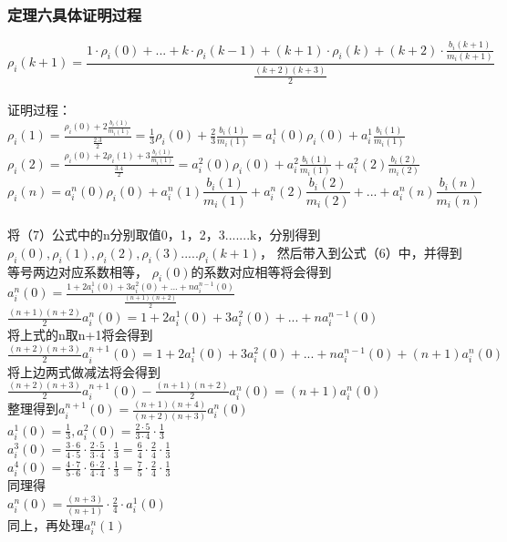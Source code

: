 \documentclass[10pt,journal,letterpaper,compsoc]{IEEEtran}
\begin{document}
\begin{CJK}{UTF8}{gkai}
\subsubsection*{定理六具体证明过程}
\begin{equation}  
\rho_i(k+1)=\frac{1\cdot\rho_i(0)+...+k\cdot\rho_i(k-1)+(k+1)\cdot\rho_i(k)+(k+2)\cdot\frac{b_i(k+1)}{m_i(k+1)}}{\frac{(k+2)(k+3)}{2}}
\end{equation}
\\证明过程：
\\$\rho_i(1)=\frac{\rho_i(0)+2\frac{b_i(1)}{m_i(1)}}{\frac{2.3}{2}}=\frac{1}{3}\rho_i(0)+\frac{2}{3}\frac{b_i(1)}{m_i(1)}=a_i^1(0)\rho_i(0)+a_i^1\frac{b_i(1)}{m_i(1)}$
\\$\rho_i(2)=\frac{\rho_i(0)+2\rho_i(1)+3\frac{b_i(1)}{m_i(1)}}{\frac{3.4}{2}}=a_i^2(0)\rho_i(0)+a_i^2\frac{b_i(1)}{m_i(1)}+a_i^2(2)\frac{b_i(2)}{m_i(2)}$
\begin{equation}
\rho_i(n)=a_i^n(0)\rho_i(0)+a_i^n(1)\frac{b_i(1)}{m_i(1)}+a_i^n(2)\frac{b_i(2)}{m_i(2)}+...+a_i^n(n)\frac{b_i(n)}{m_i(n)}
\end{equation}
\\将（7）公式中的n分别取值0，1，2，3.......k，分别得到
$\rho_i(0),\rho_i(1),\rho_i(2),\rho_i(3).....\rho_i(k+1)$，
然后带入到公式（6）中，并得到等号两边对应系数相等，
$\rho_i(0)$的系数对应相等将会得到
$a_i^n(0)=\frac{1+2a_i^1(0)+3a_i^2(0)+...+na_i^{n-1}(0)}{\frac{(n+1)(n+2)}{2}}$
\\${\frac{(n+1)(n+2)}{2}}a_i^n(0)={1+2a_i^1(0)+3a_i^2(0)+...+na_i^{n-1}(0)}$
\\将上式的n取n+1将会得到
\\${\frac{(n+2)(n+3)}{2}}a_i^{n+1}(0)={1+2a_i^1(0)+3a_i^2(0)+...+na_i^{n-1}(0)+(n+1)a_i^n(0)}$ 
\\将上边两式做减法将会得到
\\${\frac{(n+2)(n+3)}{2}}a_i^{n+1}(0)-{\frac{(n+1)(n+2)}{2}}a_i^n(0)=(n+1)a_i^n(0)$
\\整理得到$a_i^{n+1}(0)=\frac{(n+1)(n+4)}{(n+2)(n+3)}a_i^n(0)$
\\$a_i^1(0)=\frac{1}{3},a_i^2(0)=\frac{2 \cdot 5}{3 \cdot 4} \cdot \frac{1}{3}$
\\$a_i^3(0)=\frac{3 \cdot 6}{4 \cdot 5 } \cdot \frac{2 \cdot 5}{3 \cdot 4} \cdot \frac{1}{3}
=\frac{6}{4} \cdot \frac{2}{4} \cdot \frac{1}{3}$
\\$a_i^4(0)=\frac{4 \cdot 7}{5 \cdot 6 } \cdot \frac{6 \cdot 2}{4 \cdot 4} \cdot \frac{1}{3}
=\frac{7}{5} \cdot \frac{2}{4} \cdot \frac{1}{3}$
\\同理得
\\$a_i^n(0)=\frac{(n+3)}{(n+1)} \cdot \frac{2}{4} \cdot a_i^1(0)$
\\同上，再处理$a_i^n(1)$


\end{CJK}
\end{document}

